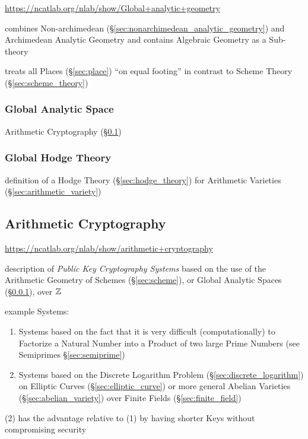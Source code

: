 \url{https://ncatlab.org/nlab/show/Global+analytic+geometry}

combines Non-archimedean (\S\ref{sec:nonarchimedean_analytic_geometry}) and
Archimedean Analytic Geometry and contains Algebraic Geometry as a Sub-theory

\fist treats all Places (\S\ref{sec:place}) ``on equal footing'' in contrast to
Scheme Theory (\S\ref{sec:scheme_theory})



\subsubsection{Global Analytic Space}\label{sec:global_analytic_space}

\fist Arithmetic Cryptography (\S\ref{sec:arithmetic_cryptography})



\subsubsection{Global Hodge Theory}\label{sec:global_hodge_theory}

definition of a Hodge Theory (\S\ref{sec:hodge_theory}) for Arithmetic
Varieties (\S\ref{sec:arithmetic_variety})



\subsection{Arithmetic Cryptography}\label{sec:arithmetic_cryptography}

\url{https://ncatlab.org/nlab/show/arithmetic+cryptography}

description of \emph{Public Key Cryptography Systems} based on the use of the
Arithmetic Geometry of Schemes (\S\ref{sec:scheme}), or Global Analytic Spaces
(\S\ref{sec:global_analytic_space}), over $\mathbb{Z}$

example Systems:
\begin{enumerate}
  \item Systems based on the fact that it is very difficult (computationally)
    to Factorize a Natural Number into a Product of two large Prime Numbers
    (see Semiprimes \S\ref{sec:semiprime})
  \item Systems based on the Discrete Logarithm Problem
    (\S\ref{sec:discrete_logarithm}) on Elliptic Curves
    (\S\ref{sec:elliptic_curve}) or more general Abelian Varieties
    (\S\ref{sec:abelian_variety}) over Finite Fields (\S\ref{sec:finite_field})
\end{enumerate}
(2) has the advantage relative to (1) by having shorter Keys without
compromising security


